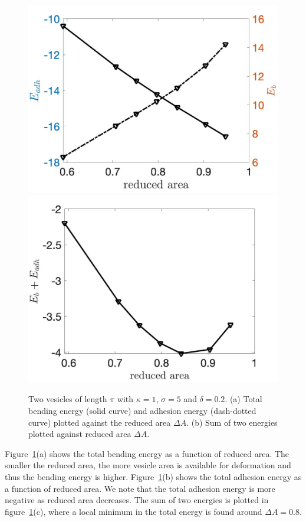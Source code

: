 \documentclass[aps,prl,twocolumn,showpacs,amsmath,amssymb]{revtex4-1}
\begin{document}
\begin{figure}
\includegraphics[keepaspectratio=true,scale=0.175]{figs/Dec18_Ebleft_Eadhright_vs_rA_adR0p2_adS502.jpeg}
\includegraphics[keepaspectratio=true,scale=0.175]{figs/Dec18_EbEadh_vs_rA_adR0p2_adS502.jpeg}
\caption{Two vesicles of length $\pi$ with $\kappa=1$, $\sigma=5$ and $\delta=0.2$. 
(a) Total bending energy (solid curve) and adhesion energy (dash-dotted curve) plotted against
the reduced area $\Delta A$. (b) Sum of two energies plotted against reduced area $\Delta A$.}
\label{fig:Dec18_vesicle_equilibrium1}
\end{figure}
Figure~\ref{fig:Dec18_vesicle_equilibrium1}(a) shows the total bending energy as a function of reduced area. The smaller the reduced area, the more vesicle area is available
for deformation and thus the bending energy is higher. Figure~\ref{fig:Dec18_vesicle_equilibrium1}(b) shows the total adhesion energy as a function of reduced area. We note
that the total adhesion energy is more negative as reduced area decreases. The sum of two energies is plotted in figure~\ref{fig:Dec18_vesicle_equilibrium1}(c), where a local minimum in the total energy is
found around $\Delta A =0.8$.
\end{document}
